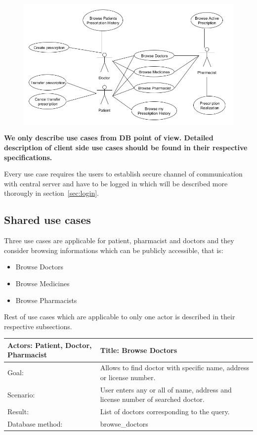 \begin{figure}[h]
\centering
\includegraphics[width=1\textwidth]{database/standardUseCases.png}
\end{figure} 
\textbf{ We only describe use cases from DB point of view.
Detailed description of client side use cases should be found in their respective specifications.}

Every use case requires the users to establish secure channel of communication with central server and have to be logged in which will be described more thorougly in section~\ref{sec:login}.
\subsection{Shared use cases}

Three use cases are applicable for patient, pharmacist and doctors and they consider browsing informations which can be publicly accessible, that is:
\begin{itemize}
\item Browse Doctors
\item Browse Medicines 
\item Browse Pharmacists
\end{itemize}
Rest of use cases which are applicable to only one actor is described in their respective subsections.

\begin{longtable}{|p{6cm}|p{7.75cm}|}
   
    \hline
    Actors: Patient, Doctor, Pharmacist &Title: Browse Doctors \\ \hline
    Goal: & Allows to find doctor with specific name, address or license number. \\ \hline
    Scenario: & User enters any or all of name, address and license number of searched doctor. \\ \hline
    Result: & List of doctors corresponding to the query. \\ \hline
    Database  method: & browse\_doctors \\ \hline
    
\end{longtable}

